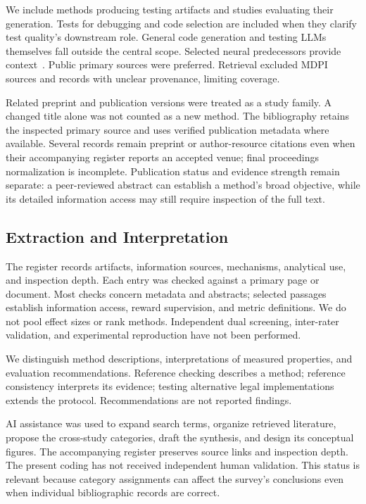 We include methods producing testing artifacts and studies evaluating their generation. Tests for debugging and code selection are included when they clarify test quality's downstream role. General code generation and testing LLMs themselves fall outside the central scope. Selected neural predecessors provide context~\cite{U11,O04}. Public primary sources were preferred. Retrieval excluded MDPI sources and records with unclear provenance, limiting coverage.

Related preprint and publication versions were treated as a study family. A changed title alone was not counted as a new method. The bibliography retains the inspected primary source and uses verified publication metadata where available. Several records remain preprint or author-resource citations even when their accompanying register reports an accepted venue; final proceedings normalization is incomplete. Publication status and evidence strength remain separate: a peer-reviewed abstract can establish a method's broad objective, while its detailed information access may still require inspection of the full text.

\subsection{Extraction and Interpretation}
The register records artifacts, information sources, mechanisms, analytical use, and inspection depth. Each entry was checked against a primary page or document. Most checks concern metadata and abstracts; selected passages establish information access, reward supervision, and metric definitions. We do not pool effect sizes or rank methods. Independent dual screening, inter-rater validation, and experimental reproduction have not been performed.

We distinguish method descriptions, interpretations of measured properties, and evaluation recommendations. Reference checking describes a method; reference consistency interprets its evidence; testing alternative legal implementations extends the protocol. Recommendations are not reported findings.

AI assistance was used to expand search terms, organize retrieved literature, propose the cross-study categories, draft the synthesis, and design its conceptual figures. The accompanying register preserves source links and inspection depth. The present coding has not received independent human validation. This status is relevant because category assignments can affect the survey's conclusions even when individual bibliographic records are correct.


